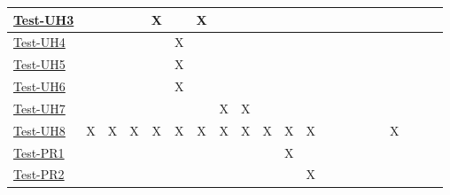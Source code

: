 \documentclass[12pt, titlepage]{article}
\begin{document}
\begin{landscape}
\begin{table}[H]
\begin{adjustwidth}{-0.3in}{-0.5in}
{\begin{tabular}{c|c|c|c|c|c|c|c|c|c|c|c|c|c|c|c|c|c|c|c|c|}
\multicolumn{1}{|l|}{\hyperref[itm:Test-UH3]{Test-UH3}}   &             &             &             &     X       &             &     X        &             &             &              &              &              &              &             &             &             &       &  &&&     \\ \hline
\multicolumn{1}{|l|}{\hyperref[itm:Test-UH4]{Test-UH4}}   &             &             &             &             &    X        &              &             &             &             &             &             &             &              &              &            &     &  &&&       \\ \hline
\multicolumn{1}{|l|}{\hyperref[itm:Test-UH5]{Test-UH5}}   &             &             &             &             &      X      &             &             &             &              &              &              &              &             &             &             &      &   &&&     \\ \hline
\multicolumn{1}{|l|}{\hyperref[itm:Test-UH6]{Test-UH6}}   &             &             &             &             &      X      &             &             &             &              &              &              &              &             &             &             &      &  &&&      \\ \hline
\multicolumn{1}{|l|}{\hyperref[itm:Test-UH7]{Test-UH7}}   &             &             &             &             &             &           &  X           &    X         &              &              &              &              &             &             &             &      &  &&&      \\ \hline
\multicolumn{1}{|l|}{\hyperref[itm:Test-UH8]{Test-UH8}}   &    X         &      X       &      X       &      X       &        X     &     X      &   X          &      X       &      X        &        X      &       X       &              &             &             &             &      & X &&&      \\ \hline
\multicolumn{1}{|l|}{\hyperref[itm:Test-PR1]{Test-PR1}}   &             &             &             &             &             &             &             &                           &              &      X        &              &             &             &             &       & &&&&      \\ \hline
\multicolumn{1}{|l|}{\hyperref[itm:Test-PR2]{Test-PR2}}   &             &             &             &             &             &             &             &                          &             &             &    X         &              &              &            &      &   &&&&     \\ \hline

\end{tabular}}
\end{adjustwidth}
\end{table}
\end{landscape}
\end{document}
